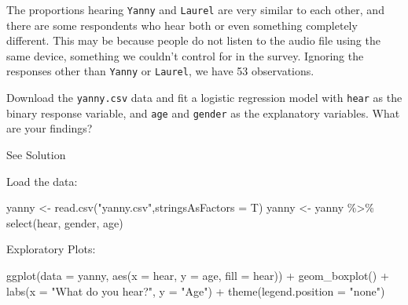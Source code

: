 \documentclass[
  letterpaper,
  DIV=11,
  numbers=noendperiod]{scrartcl}
\newenvironment{Shaded}{\begin{snugshade}}{\end{snugshade}}
\newcommand{\AttributeTok}[1]{\textcolor[rgb]{0.40,0.45,0.13}{#1}}
\newcommand{\FunctionTok}[1]{\textcolor[rgb]{0.28,0.35,0.67}{#1}}
\newcommand{\NormalTok}[1]{\textcolor[rgb]{0.00,0.23,0.31}{#1}}
\newcommand{\OtherTok}[1]{\textcolor[rgb]{0.00,0.23,0.31}{#1}}
\newcommand{\SpecialCharTok}[1]{\textcolor[rgb]{0.37,0.37,0.37}{#1}}
\newcommand{\StringTok}[1]{\textcolor[rgb]{0.13,0.47,0.30}{#1}}
\begin{document}
The proportions hearing \texttt{Yanny} and \texttt{Laurel} are very
similar to each other, and there are some respondents who hear both or
even something completely different. This may be because people do not
listen to the audio file using the same device, something we couldn't
control for in the survey. Ignoring the responses other than
\texttt{Yanny} or \texttt{Laurel}, we have 53 observations.

\begin{tcolorbox}[enhanced jigsaw, leftrule=.75mm, title={Task 1}, rightrule=.15mm, opacitybacktitle=0.6, breakable, coltitle=black, toprule=.15mm, colback=white, toptitle=1mm, opacityback=0, colframe=quarto-callout-warning-color-frame, arc=.35mm, bottomtitle=1mm, colbacktitle=quarto-callout-warning-color!10!white, titlerule=0mm, bottomrule=.15mm, left=2mm]

Download the \texttt{yanny.csv} data and fit a logistic regression model
with \texttt{hear} as the binary response variable, and \texttt{age} and
\texttt{gender} as the explanatory variables. What are your findings?

See Solution

Load the data:

\begin{Shaded}
\begin{Highlighting}[]
\NormalTok{yanny }\OtherTok{\textless{}{-}} \FunctionTok{read.csv}\NormalTok{(}\StringTok{"yanny.csv"}\NormalTok{,}\AttributeTok{stringsAsFactors =}\NormalTok{ T)}
\NormalTok{yanny }\OtherTok{\textless{}{-}}\NormalTok{ yanny }\SpecialCharTok{\%\textgreater{}\%}
          \FunctionTok{select}\NormalTok{(hear, gender, age)}
\end{Highlighting}
\end{Shaded}

Exploratory Plots:

\begin{Shaded}
\begin{Highlighting}[]
\FunctionTok{ggplot}\NormalTok{(}\AttributeTok{data =}\NormalTok{ yanny, }\FunctionTok{aes}\NormalTok{(}\AttributeTok{x =}\NormalTok{ hear, }\AttributeTok{y =}\NormalTok{ age, }\AttributeTok{fill =}\NormalTok{ hear)) }\SpecialCharTok{+}
  \FunctionTok{geom\_boxplot}\NormalTok{() }\SpecialCharTok{+}
  \FunctionTok{labs}\NormalTok{(}\AttributeTok{x =} \StringTok{"What do you hear?"}\NormalTok{, }\AttributeTok{y =} \StringTok{"Age"}\NormalTok{) }\SpecialCharTok{+}
  \FunctionTok{theme}\NormalTok{(}\AttributeTok{legend.position =} \StringTok{"none"}\NormalTok{)}
\end{Highlighting}
\end{Shaded}


\end{tcolorbox}
\end{document}
